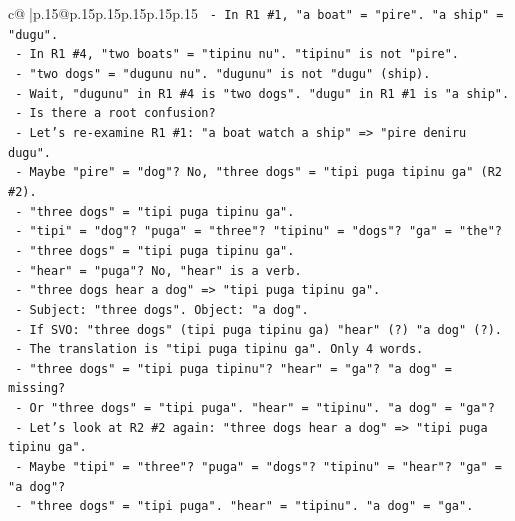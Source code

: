 \documentclass{article}
\begin{document}
{\begin{supertabular}{c@{$\;$}|p{.15\linewidth}@{}p{.15\linewidth}p{.15\linewidth}p{.15\linewidth}p{.15\linewidth}p{.15\linewidth}}
{{{\texttt{                    {-} In R1 \#1, "a boat" = "pire". "a ship" = "dugu".} \\
\texttt{                    {-} In R1 \#4, "two boats" = "tipinu nu". "tipinu" is not "pire".} \\
\texttt{                    {-} "two dogs" = "dugunu nu". "dugunu" is not "dugu" (ship).} \\
\texttt{                    {-} Wait, "dugunu" in R1 \#4 is "two dogs". "dugu" in R1 \#1 is "a ship".} \\
\texttt{                    {-} Is there a root confusion?} \\
\texttt{                    {-} Let's re{-}examine R1 \#1: "a boat watch a ship" => "pire deniru dugu".} \\
\texttt{                      {-} Maybe "pire" = "dog"? No, "three dogs" = "tipi puga tipinu ga" (R2 \#2).} \\
\texttt{                      {-} "three dogs" = "tipi puga tipinu ga".} \\
\texttt{                        {-} "tipi" = "dog"? "puga" = "three"? "tipinu" = "dogs"? "ga" = "the"?} \\
\texttt{                        {-} "three dogs" = "tipi puga tipinu ga".} \\
\texttt{                        {-} "hear" = "puga"? No, "hear" is a verb.} \\
\texttt{                        {-} "three dogs hear a dog" => "tipi puga tipinu ga".} \\
\texttt{                        {-} Subject: "three dogs". Object: "a dog".} \\
\texttt{                        {-} If SVO: "three dogs" (tipi puga tipinu ga) "hear" (?) "a dog" (?).} \\
\texttt{                        {-} The translation is "tipi puga tipinu ga". Only 4 words.} \\
\texttt{                        {-} "three dogs" = "tipi puga tipinu"? "hear" = "ga"? "a dog" = missing?} \\
\texttt{                        {-} Or "three dogs" = "tipi puga". "hear" = "tipinu". "a dog" = "ga"?} \\
\texttt{                        {-} Let's look at R2 \#2 again: "three dogs hear a dog" => "tipi puga tipinu ga".} \\
\texttt{                        {-} Maybe "tipi" = "three"? "puga" = "dogs"? "tipinu" = "hear"? "ga" = "a dog"?} \\
\texttt{                        {-} "three dogs" = "tipi puga". "hear" = "tipinu". "a dog" = "ga".} \\
}}}
\end{supertabular}}
\end{document}
